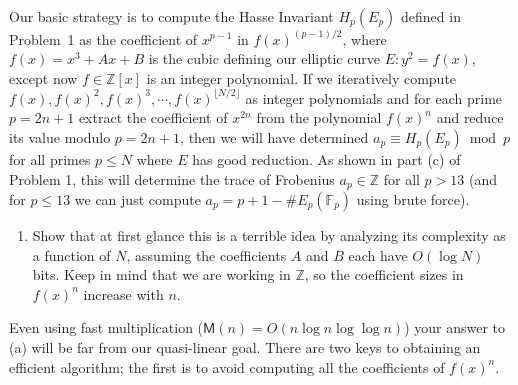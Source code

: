 \documentclass[11pt]{article}
\newcommand{\Fp}{\mathbb{F}_p}
\newcommand{\Z}{\mathbb{Z}}
\newcommand{\M}{\textsf{M}}
\begin{document}
Our basic strategy is to compute the Hasse Invariant $H_p(E_p)$ defined in Problem~1 as the coefficient of $x^{p-1}$ in $f(x)^{(p-1)/2}$, where $f(x)=x^3+Ax+B$ is the cubic defining our elliptic curve $E\colon y^2=f(x)$, except now $f\in \Z[x]$ is an integer polynomial.
If we iteratively compute $f(x),f(x)^2,f(x)^3,\cdots,f(x)^{\lfloor N/2\rfloor}$ as integer polynomials and for each prime $p=2n+1$ extract the coefficient of $x^{2n}$ from the polynomial $f(x)^n$ and reduce its value modulo $p=2n+1$, then we will have determined $a_p\equiv H_p(E_p)\bmod p$ for all primes $p\le N$ where $E$ has good reduction.
As shown in part (c) of Problem 1, this will determine the trace of Frobenius $a_p\in\Z$ for all $p>13$ (and for $p\le 13$ we can just compute $a_p=p+1-\#E_p(\Fp)$ using brute force).

\begin{enumerate}[{\bf (a)}]
\item Show that at first glance this is a terrible idea by analyzing its complexity as a function of $N$, assuming the coefficients $A$ and $B$ each have $O(\log N)$ bits.
Keep in mind that we are working in $\Z$, so the coefficient sizes in $f(x)^n$ increase with $n$.
\end{enumerate}

Even using fast multiplication ($\M(n)=O(n\log n\log\log n)$) your answer to (a) will be far from our quasi-linear goal.
There are two keys to obtaining an efficient algorithm; the first is to avoid computing all the coefficients of $f(x)^n$.
\end{document}
